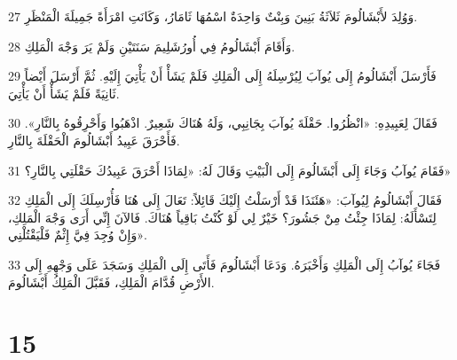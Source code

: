 \par 27 وَوُلِدَ لأَبْشَالُومَ ثَلاَثَةُ بَنِينَ وَبِنْتٌ وَاحِدَةٌ اسْمُهَا ثَامَارُ، وَكَانَتِ امْرَأَةً جَمِيلَةَ الْمَنْظَرِ.
\par 28 وَأَقَامَ أَبْشَالُومُ فِي أُورُشَلِيمَ سَنَتَيْنِ وَلَمْ يَرَ وَجْهَ الْمَلِكِ.
\par 29 فَأَرْسَلَ أَبْشَالُومُ إِلَى يُوآبَ لِيُرْسِلَهُ إِلَى الْمَلِكِ فَلَمْ يَشَأْ أَنْ يَأْتِيَ إِلَيْهِ. ثُمَّ أَرْسَلَ أَيْضاً ثَانِيَةً فَلَمْ يَشَأْ أَنْ يَأْتِيَ.
\par 30 فَقَالَ لِعَبِيدِهِ: «انْظُرُوا. حَقْلَةَ يُوآبَ بِجَانِبِي، وَلَهُ هُنَاكَ شَعِيرٌ. اذْهَبُوا وَأَحْرِقُوهُ بِالنَّارِ». فَأَحْرَقَ عَبِيدُ أَبْشَالُومَ الْحَقْلَةَ بِالنَّارِ.
\par 31 فَقَامَ يُوآبُ وَجَاءَ إِلَى أَبْشَالُومَ إِلَى الْبَيْتِ وَقَالَ لَهُ: «لِمَاذَا أَحْرَقَ عَبِيدُكَ حَقْلَتِي بِالنَّارِ؟»
\par 32 فَقَالَ أَبْشَالُومُ لِيُوآبَ: «هَئَنَذَا قَدْ أَرْسَلْتُ إِلَيْكَ قَائِلاً: تَعَالَ إِلَى هُنَا فَأُرْسِلَكَ إِلَى الْمَلِكِ لِتَسْأَلَهُ: لِمَاذَا جِئْتُ مِنْ جَشُورَ؟ خَيْرٌ لِي لَوْ كُنْتُ بَاقِياً هُنَاكَ. فَالآنَ إِنِّي أَرَى وَجْهَ الْمَلِكِ، وَإِنْ وُجِدَ فِيَّ إِثْمٌ فَلْيَقْتُلْنِي».
\par 33 فَجَاءَ يُوآبُ إِلَى الْمَلِكِ وَأَخْبَرَهُ. وَدَعَا أَبْشَالُومَ فَأَتَى إِلَى الْمَلِكِ وَسَجَدَ عَلَى وَجْهِهِ إِلَى الأَرْضِ قُدَّامَ الْمَلِكِ، فَقَبَّلَ الْمَلِكُ أَبْشَالُومَ.

\chapter{15}

